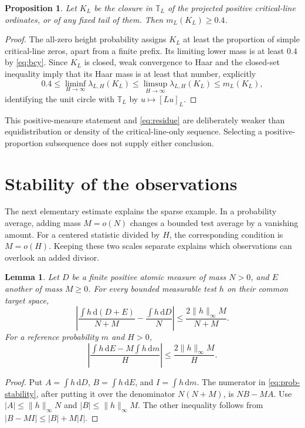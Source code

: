 \documentclass[11pt,a4paper]{article}
\newtheorem{proposition}[theorem]{Proposition}
\newtheorem{lemma}[theorem]{Lemma}
\theoremstyle{definition}
\theoremstyle{remark}
\newcommand{\T}{\mathbb T}
\newcommand{\dd}{\,\mathrm d}
\begin{document}
\begin{proposition}\label{prop:closure}
Let $K_L$ be the closure in $\T_L$ of the projected positive critical-line
ordinates, or of any fixed tail of them. Then $m_L(K_L)\ge0.4$.
\end{proposition}
\begin{proof}
The all-zero height probability assigns $K_L$ at least the proportion of
simple critical-line zeros, apart from a finite prefix. Its limiting lower
mass is at least $0.4$ by \eqref{eq:bcy}. Since $K_L$ is closed, weak
convergence to Haar and the closed-set inequality imply that its Haar mass
is at least that number, explicitly
\[
 0.4\le\liminf_{H\to\infty}\lambda_{L,H}(K_L)
 \le\limsup_{H\to\infty}\lambda_{L,H}(K_L)\le m_L(K_L),
\]
identifying the unit circle with $\T_L$ by $u\mapsto[Lu]_L$.
\end{proof}
This positive-measure statement and \eqref{eq:residue} are deliberately
weaker than equidistribution or density of the critical-line-only sequence.
Selecting a positive-proportion subsequence does not supply either conclusion.

\section{Stability of the observations}\label{sec:secondary}

The next elementary estimate explains the sparse example. In a probability
average, adding mass $M=o(N)$ changes a bounded test average by a vanishing
amount. For a centered statistic divided by $H$, the corresponding condition
is $M=o(H)$. Keeping these two scales separate explains which observations
can overlook an added divisor.

\begin{lemma}\label{lem:stability}
Let $D$ be a finite positive atomic measure of mass $N>0$, and $E$ another
of mass $M\ge0$. For every bounded measurable test $h$ on their common target space,
\begin{equation}\label{eq:prob-stability}
 \left|\frac{\int h\dd(D+E)}{N+M}-\frac{\int h\dd D}{N}\right|
       \le\frac{2\|h\|_\infty M}{N+M}.
\end{equation}
For a reference probability $m$ and $H>0$,
\begin{equation}\label{eq:secondary-stability}
 \left|\frac{\int h\dd E-M\int h\dd m}{H}\right|
       \le\frac{2\|h\|_\infty M}{H}.
\end{equation}
\end{lemma}
\begin{proof}
Put $A=\int h\dd D$, $B=\int h\dd E$, and $I=\int h\dd m$.
The numerator in \eqref{eq:prob-stability}, after putting it over the
denominator $N(N+M)$, is $NB-MA$. Use
$|A|\le\|h\|_\infty N$ and $|B|\le\|h\|_\infty M$.
The other inequality follows from $|B-MI|\le |B|+M|I|$.
\end{proof}
\end{document}
